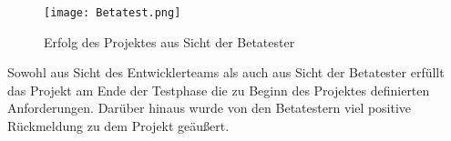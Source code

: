 \begin{figure}[htb]
\centering
\texttt{[image: Betatest.png]}
\caption[Erfolg des Projektes aus Sicht der Betatester]{Erfolg des Projektes aus Sicht der Betatester\protect\footnotemark}
\label{fig:Betatest}
\end{figure}

Sowohl aus Sicht des Entwicklerteams als auch aus Sicht der Betatester erfüllt
das Projekt am Ende der Testphase die zu Beginn des Projektes definierten
Anforderungen. Darüber hinaus wurde von den Betatestern viel positive
Rückmeldung zu dem Projekt geäußert.
